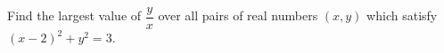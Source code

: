 Find the largest value of $\dfrac{y}{x}$ over all pairs of real numbers $(x,y)$ which satisfy $(x-2)^2+y^2=3$.
